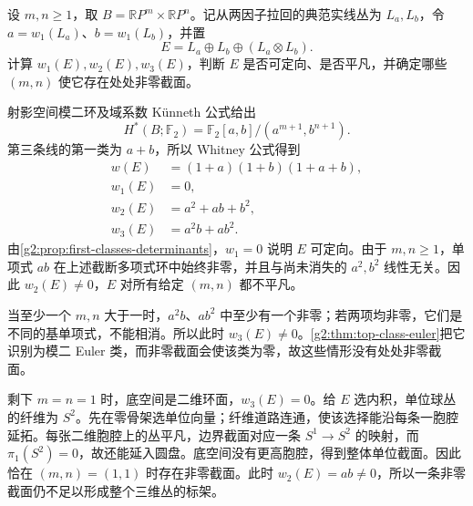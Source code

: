 \begin{exercise}\label{g2:ex:three-real-lines-projective-product}
	设 \(m,n\ge1\)，取 \(B=\mathbb RP^m\times\mathbb RP^n\)。记从两因子拉回的典范实线丛为 \(L_a,L_b\)，令 \(a=w_1(L_a)\)、\(b=w_1(L_b)\)，并置
	\[
		E=L_a\oplus L_b\oplus(L_a\otimes L_b).
	\]
	计算 \(w_1(E),w_2(E),w_3(E)\)，判断 \(E\) 是否可定向、是否平凡，并确定哪些 \((m,n)\) 使它存在处处非零截面。
\end{exercise}
\begin{solution}
	射影空间模二环及域系数 Künneth 公式给出
	\[
		H^*(B;\mathbb F_2)=\mathbb F_2[a,b]/(a^{m+1},b^{n+1}).
	\]
	第三条线的第一类为 \(a+b\)，所以 Whitney 公式得到
	\[
	\begin{aligned}
		w(E)&=(1+a)(1+b)(1+a+b),\\
		w_1(E)&=0,\\
		w_2(E)&=a^2+ab+b^2,\\
		w_3(E)&=a^2b+ab^2.
	\end{aligned}
	\]
	由\cref{g2:prop:first-classes-determinants}，\(w_1=0\) 说明 \(E\) 可定向。由于 \(m,n\ge1\)，单项式 \(ab\) 在上述截断多项式环中始终非零，并且与尚未消失的 \(a^2,b^2\) 线性无关。因此 \(w_2(E)\ne0\)，\(E\) 对所有给定 \((m,n)\) 都不平凡。

	当至少一个 \(m,n\) 大于一时，\(a^2b\)、\(ab^2\) 中至少有一个非零；若两项均非零，它们是不同的基单项式，不能相消。所以此时 \(w_3(E)\ne0\)。\cref{g2:thm:top-class-euler}把它识别为模二 Euler 类，而非零截面会使该类为零，故这些情形没有处处非零截面。

	剩下 \(m=n=1\) 时，底空间是二维环面，\(w_3(E)=0\)。给 \(E\) 选内积，单位球丛的纤维为 \(S^2\)。先在零骨架选单位向量；纤维道路连通，使该选择能沿每条一胞腔延拓。每张二维胞腔上的丛平凡，边界截面对应一条 \(S^1\to S^2\) 的映射，而 \(\pi_1(S^2)=0\)，故还能延入圆盘。底空间没有更高胞腔，得到整体单位截面。因此恰在 \((m,n)=(1,1)\) 时存在非零截面。此时 \(w_2(E)=ab\ne0\)，所以一条非零截面仍不足以形成整个三维丛的标架。
\end{solution}

